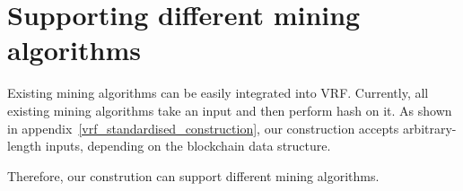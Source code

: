 \section{Supporting different mining algorithms}

Existing mining algorithms can be easily integrated into VRF.
Currently, all existing mining algorithms take an input and then perform hash on it. 
As shown in appendix~\ref{vrf_standardised_construction}, our construction accepts arbitrary-length inputs, depending on the blockchain data structure.

Therefore, our constrution can support different mining algorithms.
